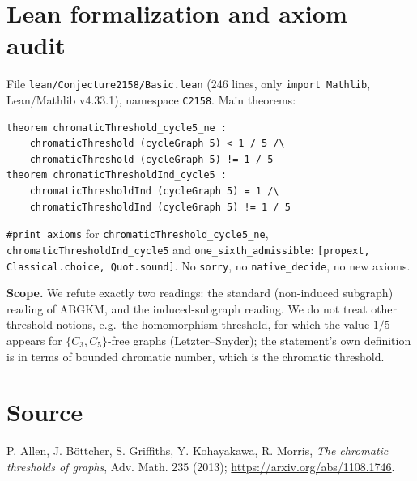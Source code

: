 \documentclass[11pt]{article}
\theoremstyle{definition}
\theoremstyle{remark}
\begin{document}
\section{Lean formalization and axiom audit}

File \texttt{lean/Conjecture2158/Basic.lean} (246 lines, only \texttt{import Mathlib}, Lean/Mathlib v4.33.1),
namespace \texttt{C2158}. Main theorems:
\begin{verbatim}
theorem chromaticThreshold_cycle5_ne :
    chromaticThreshold (cycleGraph 5) < 1 / 5 /\
    chromaticThreshold (cycleGraph 5) != 1 / 5
theorem chromaticThresholdInd_cycle5 :
    chromaticThresholdInd (cycleGraph 5) = 1 /\
    chromaticThresholdInd (cycleGraph 5) != 1 / 5
\end{verbatim}
\texttt{\#print axioms} for \texttt{chromaticThreshold\_cycle5\_ne}, \texttt{chromaticThresholdInd\_cycle5} and
\texttt{one\_sixth\_admissible}: \texttt{[propext, Classical.choice, Quot.sound]}. No \texttt{sorry}, no
\texttt{native\_decide}, no new axioms.

\textbf{Scope.} We refute exactly two readings: the standard (non-induced subgraph) reading of ABGKM, and the
induced-subgraph reading. We do not treat other threshold notions, e.g.\ the homomorphism threshold, for which the
value $1/5$ appears for $\{C_3,C_5\}$-free graphs (Letzter--Snyder); the statement's own definition is in terms of
bounded chromatic number, which is the chromatic threshold.

\section*{Source}
P. Allen, J. B\"ottcher, S. Griffiths, Y. Kohayakawa, R. Morris, \emph{The chromatic thresholds of graphs},
Adv. Math. 235 (2013); \url{https://arxiv.org/abs/1108.1746}.
\end{document}
